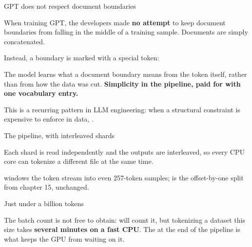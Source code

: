 \documentclass[aspectratio=169,11pt,t]{beamer}
\begin{document}
\begin{frame}[shrink=25]{GPT does not respect document boundaries}
{\fontsize{9.4}{12.6}\selectfont\color{fg2}When training GPT, the developers made \textbf{no attempt} to keep document boundaries from falling in the middle of a training sample. Documents are simply concatenated.\par}\vskip 4pt
{\fontsize{9.4}{12.6}\selectfont\color{fg2}Instead, a boundary is marked with a special token:\par}\vskip 4pt
{\fontsize{9.4}{12.6}\selectfont\color{fg2}The model learns what a document boundary means from the token itself, rather than from how the data was cut. \textbf{Simplicity in the pipeline, paid for with one vocabulary entry.}\par}\vskip 4pt
\begin{iband}[signal]
This is a recurring pattern in LLM engineering: when a structural constraint is expensive to enforce in data, .
\end{iband}
\end{frame}

\begin{frame}[shrink=25]{The pipeline, with interleaved shards}
{\fontsize{9.4}{12.6}\selectfont\color{fg2}Each shard is read independently and the outputs are interleaved, so every CPU core can tokenize a different file at the same time.\par}\vskip 4pt
{\fontsize{9.4}{12.6}\selectfont\color{fg2} windows the token stream into even 257-token samples;  is the offset-by-one split from chapter 15, unchanged.\par}\vskip 4pt
\end{frame}

\begin{frame}[shrink=25]{Just under a billion tokens}
\begin{minipage}[t]{0.3253\textwidth}
\end{minipage}%
\hfill
\begin{minipage}[t]{0.3253\textwidth}
\end{minipage}%
\hfill
\begin{minipage}[t]{0.3253\textwidth}
\end{minipage}%
{\fontsize{9.4}{12.6}\selectfont\color{fg2}The batch count is not free to obtain:  will count it, but tokenizing a dataset this size takes \textbf{several minutes on a fast CPU}. The  at the end of the pipeline is what keeps the GPU from waiting on it.\par}\vskip 4pt
\end{frame}
\end{document}
